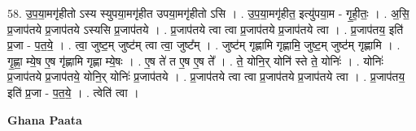 \documentclass[17pt]{extarticle}
\begin{document}
58. उ॒प॒या॒मगृ॑हीतो ऽस्य स्युपया॒मगृ॑हीत उपया॒मगृ॑हीतो ऽसि । . उ॒प॒या॒मगृ॑हीत॒ इत्यु॑पया॒म - गृ॒ही॒तः॒ । . अ॒सि॒ प्र॒जाप॑तये प्र॒जाप॑तये ऽस्यसि प्र॒जाप॑तये । . प्र॒जाप॑तये त्वा त्वा प्र॒जाप॑तये प्र॒जाप॑तये त्वा । . प्र॒जाप॑तय॒ इति॑ प्र॒जा - प॒त॒ये॒ । . त्वा॒ जुष्ट॒म् जुष्ट॑म् त्वा त्वा॒ जुष्ट᳚म् । . जुष्ट॑म् गृह्णामि गृह्णामि॒ जुष्ट॒म् जुष्ट॑म् गृह्णामि । . गृ॒ह्णा॒ म्ये॒ष ए॒ष गृ॑ह्णामि गृह्णा म्ये॒षः । . ए॒ष ते॑ त ए॒ष ए॒ष ते᳚ । . ते॒ योनि॒र् योनि॑ स्ते ते॒ योनिः॑ । . योनिः॑ प्र॒जाप॑तये प्र॒जाप॑तये॒ योनि॒र् योनिः॑ प्र॒जाप॑तये । . प्र॒जाप॑तये त्वा त्वा प्र॒जाप॑तये प्र॒जाप॑तये त्वा । . प्र॒जाप॑तय॒ इति॑ प्र॒जा - प॒त॒ये॒ । . त्वेति॑ त्वा । \newline

\textbf{Ghana Paata } \newline
\end{document}
